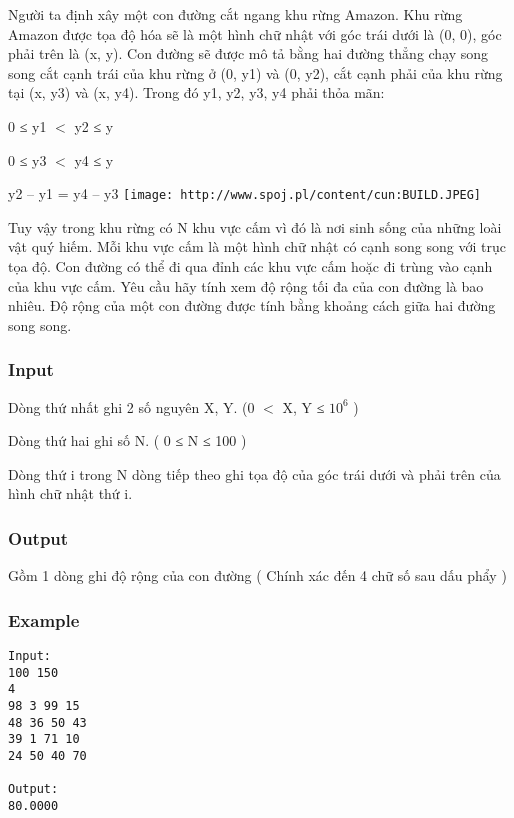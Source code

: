 



   Người ta định xây một con đường cắt ngang khu rừng Amazon. Khu rừng Amazon được tọa độ hóa sẽ là một hình chữ nhật với góc trái dưới là (0, 0), góc phải trên là (x, y). Con đường sẽ được mô tả bằng hai đường thẳng chạy song song cắt cạnh trái của khu rừng ở (0, y1) và (0, y2), cắt cạnh phải của khu rừng tại (x, y3) và (x, y4). Trong đó y1, y2, y3, y4 phải thỏa mãn:  

   0 ≤ y1 $<$ y2 ≤ y  

   0 ≤ y3 $<$ y4 ≤ y  

   y2 – y1 = y4 – y3  
\texttt{[image: http://www.spoj.pl/content/cun:BUILD.JPEG]}

   Tuy vậy trong khu rừng có N khu vực cấm vì đó là nơi sinh sống của những loài vật quý hiếm. Mỗi khu vực cấm là một hình chữ nhật có cạnh song song với trục tọa độ. Con đường có thể đi qua đỉnh các khu vực cấm hoặc đi trùng vào cạnh của khu vực cấm. Yêu cầu hãy tính xem độ rộng tối đa của con đường là bao nhiêu. Độ rộng của một con đường được tính bằng khoảng cách giữa hai đường song song.  

\subsubsection{   Input  }

   Dòng thứ nhất ghi 2 số nguyên X, Y. (0 $<$ X, Y ≤ $10^{6}$   )  

   Dòng thứ hai ghi số N. ( 0 ≤ N ≤ 100 )  

   Dòng thứ i trong N dòng tiếp theo ghi tọa độ của góc trái dưới và phải trên của hình chữ nhật thứ i.  

\subsubsection{   Output  }

   Gồm 1 dòng ghi độ rộng của con đường ( Chính xác đến 4 chữ số sau dấu phẩy )  

\subsubsection{   Example  }
\begin{verbatim}
Input:
100 150
4
98 3 99 15
48 36 50 43
39 1 71 10
24 50 40 70

Output:
80.0000
\end{verbatim}
